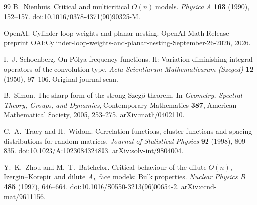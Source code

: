 \begin{thebibliography}{99}
B.~Nienhuis.
Critical and multicritical $O(n)$ models.
\emph{Physica A} \textbf{163} (1990), 152--157.
\href{https://doi.org/10.1016/0378-4371(90)90325-M}{doi:10.1016/0378-4371(90)90325-M}.

OpenAI.
Cylinder loop weights and planar nesting.
OpenAI Math Release preprint
\href{https://github.com/openai/math/blob/main/preprints/Cylinder-loop-weights-and-planar-nesting-September-26-2026/main.pdf}{OAI:Cylinder-loop-weights-and-planar-nesting-September-26-2026},
2026.

I.~J. Schoenberg.
On P\'olya frequency functions. II: Variation-diminishing integral
operators of the convolution type.
\emph{Acta Scientiarum Mathematicarum (Szeged)} \textbf{12} (1950), 97--106.
\href{https://acta.bibl.u-szeged.hu/13626/1/math_012_pars_b_097-106.pdf}{Original journal scan}.

B.~Simon.
The sharp form of the strong Szeg\H{o} theorem.
In \emph{Geometry, Spectral Theory, Groups, and Dynamics},
Contemporary Mathematics \textbf{387}, American Mathematical Society,
2005, 253--275.
\href{https://arxiv.org/abs/math/0402110}{arXiv:math/0402110}.

C.~A.~Tracy and H.~Widom.
Correlation functions, cluster functions and spacing distributions
for random matrices.
\emph{Journal of Statistical Physics} \textbf{92} (1998), 809--835.
\href{https://doi.org/10.1023/A:1023084324803}{doi:10.1023/A:1023084324803}.
\href{https://arxiv.org/abs/solv-int/9804004}{arXiv:solv-int/9804004}.

Y.~K.~Zhou and M.~T.~Batchelor.
Critical behaviour of the dilute $O(n)$, Izergin--Korepin and dilute
$A_L$ face models: Bulk properties.
\emph{Nuclear Physics B} \textbf{485} (1997), 646--664.
\href{https://doi.org/10.1016/S0550-3213(96)00654-2}{doi:10.1016/S0550-3213(96)00654-2}.
\href{https://arxiv.org/abs/cond-mat/9611156}{arXiv:cond-mat/9611156}.
\end{thebibliography}
